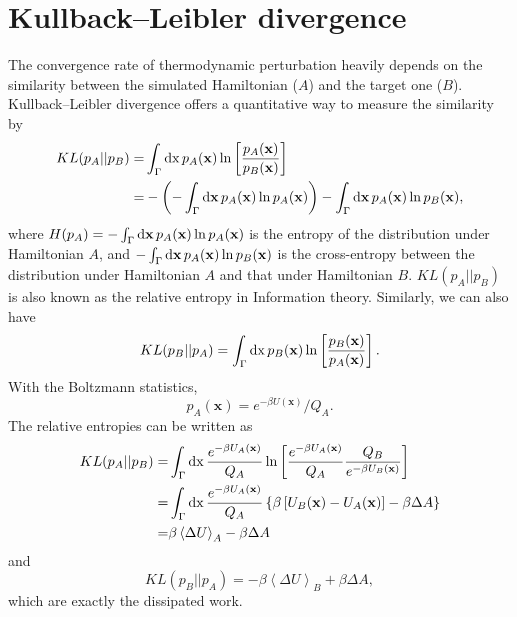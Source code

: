 \section{Kullback–Leibler divergence\label{Sec:Eva:KLDverg}}
The convergence rate of thermodynamic perturbation heavily depends on the similarity between the simulated Hamiltonian ($A$) and the target one ($B$). Kullback–Leibler divergence offers a quantitative way to measure the similarity by
\begin{align}
	KL(p_A||p_B)=&\int_\Gamma \mathop{}\!\mathrm{d} \mathrm{x}\, p_A(\mathbf{x})\ln\left[\frac{p_A(\mathbf{x})}{p_B(\mathbf{x})}\right]\notag\\
	   =&-\left(-\int_\Gamma \mathop{}\!\mathrm{d} \mathbf{x}\, p_A(\mathbf{x})\ln p_A(\mathbf{x})\right)-\int_\Gamma \mathop{}\!\mathrm{d} \mathbf{x}\, p_A(\mathbf{x})\ln p_B(\mathbf{x}),
\end{align}
where $H(p_A)=-\int_\Gamma \mathop{}\!\mathrm{d} \mathbf{x}\, p_A(\mathbf{x})\ln p_A(\mathbf{x})$ is the entropy of the distribution under Hamiltonian $A$, and $-\int_\Gamma \mathop{}\!\mathrm{d} \mathbf{x}\, p_A(\mathbf{x})\ln p_B(\mathbf{x})$ is the cross-entropy between the distribution under Hamiltonian $A$ and that under Hamiltonian $B$. $KL(p_A||p_B)$ is also known as the relative entropy in Information theory. Similarly, we can also have
\begin{equation}
	KL(p_B||p_A)=\int_\Gamma \mathop{}\!\mathrm{d} \mathrm{x}\, p_B(\mathbf{x})\ln\left[\frac{p_B(\mathbf{x})}{p_A(\mathbf{x})}\right].
\end{equation}
With the Boltzmann statistics,
\begin{equation}
	p_A(\mathbf{x})=e^{-\beta U(\mathbf{x})}/Q_A.
\end{equation}
The relative entropies can be written as
\begin{align}
	KL(p_A||p_B)=&\int_\Gamma \mathop{}\!\mathrm{d} \mathrm{x}\, \frac{e^{-\beta U_A(\mathbf{x})}}{Q_A}\ln\left[\frac{e^{-\beta U_A(\mathbf{x})}}{Q_A}\frac{Q_B}{e^{-\beta U_B(\mathbf{x})}}\right]\notag\\
	   =&\int_\Gamma \mathop{}\!\mathrm{d} \mathrm{x}\, \frac{e^{-\beta U_A(\mathbf{x})}}{Q_A} \left\{\beta \left[U_B(\mathbf{x})-U_A(\mathbf{x})\right]-\beta \Delta A\right\}\\
	   =&\beta\left<\Delta U\right>_A-\beta \Delta A
\end{align}
and
\begin{equation}
	KL(p_B||p_A)=-\beta\left<\Delta U\right>_B+\beta \Delta A,
\end{equation}
which are exactly the dissipated work\cite{WuJCP2005}.

